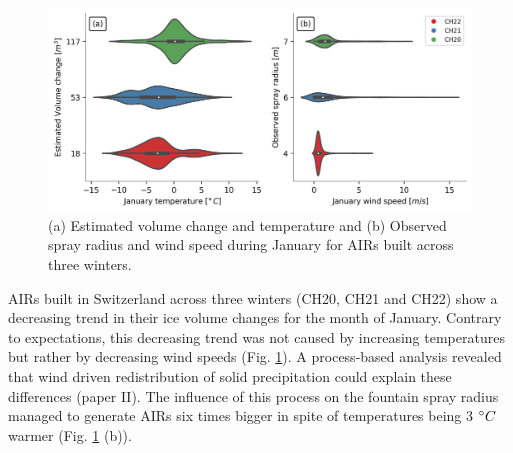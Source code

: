 \begin{figure}[htb]
	\centering
	\includegraphics[width=\textwidth]{figs/CH_diffs.jpg}
	\caption{(a) Estimated volume change and temperature and (b) Observed spray radius and wind speed
		during January for \ac{AIRs} built across three winters. }
	\label{fig:CH_diffs}
\end{figure}

\ac{AIRs} built in Switzerland across three winters (CH20, CH21 and CH22) show a decreasing trend in their ice volume
changes for the month of January. Contrary to expectations, this decreasing trend was not caused by increasing
temperatures but rather by decreasing wind speeds (Fig. \ref{fig:CH_diffs}). A process-based analysis revealed
that wind driven redistribution of solid precipitation could explain these differences (paper II). The influence of this process on
the fountain spray radius managed to generate \ac{AIRs} six times bigger in spite of temperatures being 3 $^{\circ} C$
warmer (Fig. \ref{fig:CH_diffs} (b)).



